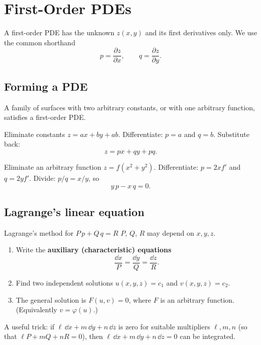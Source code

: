 \chapter{First-Order PDEs}

A first-order PDE has the unknown $z(x,y)$ and its first derivatives only. We use the common shorthand
\[ p = \frac{\partial z}{\partial x}, \qquad q = \frac{\partial z}{\partial y}. \]

\section{Forming a PDE}

A family of surfaces with two arbitrary constants, or with one arbitrary function, satisfies a first-order PDE.

\begin{examplebox}{Eliminate constants}
$z = ax + by + ab$. Differentiate: $p = a$ and $q = b$. Substitute back:
\[ z = px + qy + pq. \]
\end{examplebox}

\begin{examplebox}{Eliminate an arbitrary function}
$z = f(x^2 + y^2)$. Differentiate: $p = 2x f'$ and $q = 2y f'$. Divide: $p/q = x/y$, so
\[ y\,p - x\,q = 0. \]
\end{examplebox}

\section{Lagrange's linear equation}

\begin{methodbox}{Lagrange's method for $P\,p + Q\,q = R$}
$P$, $Q$, $R$ may depend on $x,y,z$.
\begin{enumerate}
  \item Write the \textbf{auxiliary (characteristic) equations}
  \[ \frac{\dd x}{P} = \frac{\dd y}{Q} = \frac{\dd z}{R}. \]
  \item Find two independent solutions $u(x,y,z) = c_1$ and $v(x,y,z) = c_2$.
  \item The general solution is $F(u,v) = 0$, where $F$ is an arbitrary function. (Equivalently $v = \varphi(u)$.)
\end{enumerate}
A useful trick: if $\ell\,\dd x + m\,\dd y + n\,\dd z$ is zero for suitable multipliers $\ell,m,n$ (so that $\ell P + mQ + nR=0$), then $\ell\,\dd x + m\,\dd y + n\,\dd z = 0$ can be integrated.
\end{methodbox}

